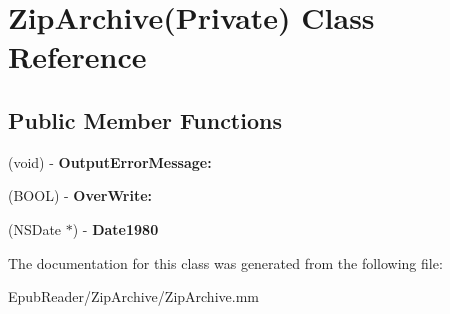 \hypertarget{interface_zip_archive_07_private_08}{\section{Zip\-Archive(Private) Class Reference}
\label{interface_zip_archive_07_private_08}
}
\subsection*{Public Member Functions}
\begin{DoxyCompactItemize}
\item 
\hypertarget{interface_zip_archive_07_private_08_ab57b1011111c02b5c0248d838dffa717}{(void) -\/ {\bfseries Output\-Error\-Message\-:}}\label{interface_zip_archive_07_private_08_ab57b1011111c02b5c0248d838dffa717}

\item 
\hypertarget{interface_zip_archive_07_private_08_aeda3dea3b9c772e28e62e7723ae3215a}{(B\-O\-O\-L) -\/ {\bfseries Over\-Write\-:}}\label{interface_zip_archive_07_private_08_aeda3dea3b9c772e28e62e7723ae3215a}

\item 
\hypertarget{interface_zip_archive_07_private_08_aa67d81e00db4450942c3dc137ece3b4b}{(N\-S\-Date $\ast$) -\/ {\bfseries Date1980}}\label{interface_zip_archive_07_private_08_aa67d81e00db4450942c3dc137ece3b4b}

\end{DoxyCompactItemize}


The documentation for this class was generated from the following file\-:\begin{DoxyCompactItemize}
\item 
Epub\-Reader/\-Zip\-Archive/Zip\-Archive.\-mm\end{DoxyCompactItemize}
